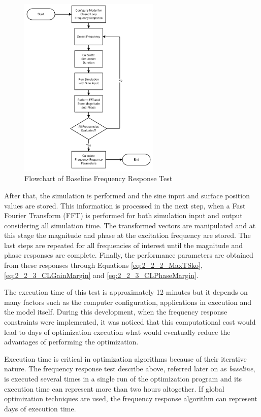 \begin{figure}[H]
	\centering
	\centerline{\includegraphics[width=0.6\textwidth]{Figuras/4.DynamicStifinessOptimizationAlgorithm/4-3-2-BaselineFrequencyResponse.jpg}}
	\caption{Flowchart of Baseline Frequency Response Test}
	\label{fig:4_3_2_FrequencyResponseFlowchart}
\end{figure}

After that, the simulation is performed and the sine input and surface position values are stored. This information is processed in the next step, when a Fast Fourier Transform (FFT) is performed for both simulation input and output considering all simulation time. The transformed vectors are manipulated and at this stage the magnitude and phase at the excitation frequency are stored. The last steps are repeated for all frequencies of interest until the magnitude and phase responses are complete. Finally, the performance parameters are obtained from these responses through Equations \ref{eq:2_2_2_MaxTSko}, \ref{eq:2_2_3_CLGainMargin} and \ref{eq:2_2_3_CLPhaseMargin}.

The execution time of this test is approximately 12 minutes but it depends on many factors such as the computer configuration, applications in execution and the model itself. During this development, when the frequency response constraints were implemented, it was noticed that this computational cost would lead to days of optimization execution what would eventually reduce the advantages of performing the optimization. 

Execution time is critical in optimization algorithms because of their iterative nature. The frequency response test describe above, referred later on as \textit{baseline}, is executed several times in a single run of the optimization program and its execution time can represent more than two hours altogether. If global optimization techniques are used, the frequency response algorithm can represent days of execution time.


